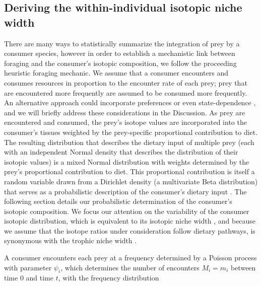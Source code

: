 \documentclass{frontiersSCNS}
\begin{document}
\subsection*{Deriving the within-individual isotopic niche width}
There are many ways to statistically summarize the integration of prey by a consumer species, however in order to establish a mechanistic link between foraging and the consumer's isotopic composition, we follow the proceeding heuristic foraging mechanic.
We assume that a consumer encounters and consumes resources in proportion to the encounter rate of each prey; prey that are encountered more frequently are assumed to be consumed more frequently.
An alternative approach could incorporate preferences \citep{Chesson:1983bt} or even state-dependence \citep{Mangel:1988uaa,Clark:2000tra,Mangel:2014kz}, and we will briefly address these considerations in the Discussion.
As prey are encountered and consumed, the prey's isotope values are incorporated into the consumer's tissues weighted by the prey-specific proportional contribution to diet.
The resulting distribution that describes the dietary input of multiple prey (each with an independent Normal density that describes the distribution of their isotopic values) is a mixed Normal distribution with weights determined by the prey's proportional contribution to diet.
This proportional contribution is itself a random variable drawn from a Dirichlet density (a multivariate Beta distribution) that serves as a probabilistic description of the consumer's dietary input \citep{Ainsworth:2010uo}.
The following section details our probabilistic determination of the consumer's isotopic composition.
We focus our attention on the variability of the consumer isotopic distribution, which is equivalent to its isotopic niche width \citep{Newsome:2007tz}, and because we assume that the isotope ratios under consideration follow dietary pathways, is synonymous with the trophic niche width \citep{Bearhop:2004im}.


A consumer encounters each prey at a frequency determined by a Poisson process with parameter $\psi_i$, which determines the number of encounters $M_i=m_i$ between time 0 and time $t$, with the frequency distribution
\end{document}

